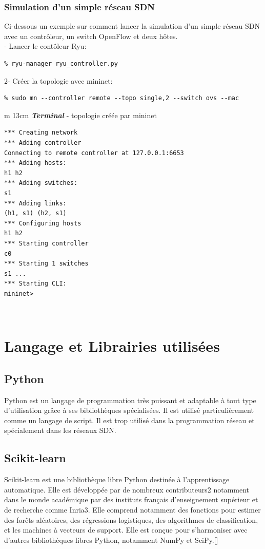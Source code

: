 \subsubsection{Simulation d'un simple réseau SDN}
Ci-dessous un exemple sur comment lancer la simulation d'un simple réseau SDN avec un contrôleur, un switch OpenFlow et deux hôtes.\\

- Lancer le contôleur Ryu:
\begin{verbatim}
% ryu-manager ryu_controller.py 
\end{verbatim}
2- Créer la topologie avec mininet:
\begin{verbatim}
% sudo mn --controller remote --topo single,2 --switch ovs --mac
\end{verbatim}

\begin{tabular}{m {13cm}}
\hline
\textbf{\textit{Terminal}} - topologie créée par mininet\\
\hline
\begin{verbatim}
*** Creating network
*** Adding controller
Connecting to remote controller at 127.0.0.1:6653
*** Adding hosts:
h1 h2 
*** Adding switches:
s1 
*** Adding links:
(h1, s1) (h2, s1) 
*** Configuring hosts
h1 h2 
*** Starting controller
c0 
*** Starting 1 switches
s1 ...
*** Starting CLI:
mininet> 
\end{verbatim}\\
\hline
\end{tabular}

\section{Langage et Librairies utilisées}

\subsection{Python}
Python est un langage de programmation très puissant et adaptable à tout type d’utilisation grâce à ses bibliothèques spécialisées. Il est utilisé particulièrement comme un langage de script. Il est trop utilisé dans la programmation réseau et spécialement dans les réseaux SDN.

\subsection{Scikit-learn}
Scikit-learn est une bibliothèque libre Python destinée à l'apprentissage automatique. Elle est développée par de nombreux contributeurs2 notamment dans le monde académique par des instituts français d'enseignement supérieur et de recherche comme Inria3. Elle comprend notamment des fonctions pour estimer des forêts aléatoires, des régressions logistiques, des algorithmes de classification, et les machines à vecteurs de support. Elle est conçue pour s'harmoniser avec d'autres bibliothèques libres Python, notamment NumPy et SciPy.[\cite{29}] 

